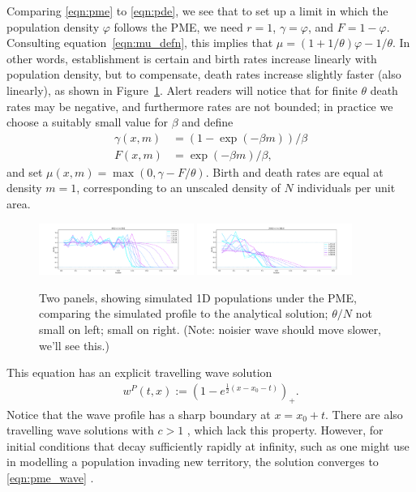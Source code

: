 \documentclass[12pt]{article}
\begin{document}
Comparing \eqref{eqn:pme} to \eqref{eqn:pde},
we see that to set up a limit in which the population density $\varphi$ follows the PME,
we need $r=1$,
$\gamma = \varphi$, and $F = 1 - \varphi$.
Consulting equation~\eqref{eqn:mu_defn},
this implies that $\mu = (1 + 1/\theta) \varphi - 1/\theta$.
In other words,
establishment is certain
and birth rates increase linearly with population density,
but to compensate, death rates increase slightly faster (also linearly),
as shown in Figure~\ref{fig:pme_waves}.
Alert readers will notice that
for finite $\theta$ death rates may be negative,
and furthermore rates are not bounded;
in practice we choose a suitably small value for $\beta$ and define
\begin{align*}
    \gamma(x, m) &= (1 - \exp(- \beta m)) / \beta \\
    F(x, m) &= \exp(- \beta m) / \beta ,
\end{align*}
and set $\mu(x, m) = \max(0, \gamma - F / \theta)$.
Birth and death rates are equal at density $m = 1$,
corresponding to an unscaled density of $N$ individuals per unit area.

\begin{figure}
    \begin{center}
        \includegraphics[width=0.45\textwidth]{figures/ex2a/pme_123.steps}
        \includegraphics[width=0.45\textwidth]{figures/ex2b/pme_123.steps}
    \end{center}
    \caption{
        Two panels, showing simulated 1D populations under the PME, comparing the simulated
        profile to the analytical solution;
        $\theta/N$ not small on left; small on right.
        (Note: noisier wave should move slower, we'll see this.)
        \label{fig:pme_waves}
    }
\end{figure}

This equation has an explicit travelling wave solution
\begin{align} \label{eqn:pme_wave}
    w^P(t, x)
    :=
    \left( 1 - e^{ \frac{1}{2} (x - x_0 - t) } \right)_+ .
\end{align}
Notice that the wave profile has a sharp boundary at $x = x_0 + t$.
There are also travelling wave solutions with $c>1$ \citep{gilding/kersner:2005},
which lack this property.
However, for initial conditions that decay sufficiently rapidly at infinity,
such as one might use in modelling a population invading new territory,
the solution converges to \eqref{eqn:pme_wave} \citep{kamin/rosenau:2004}.
\end{document}
